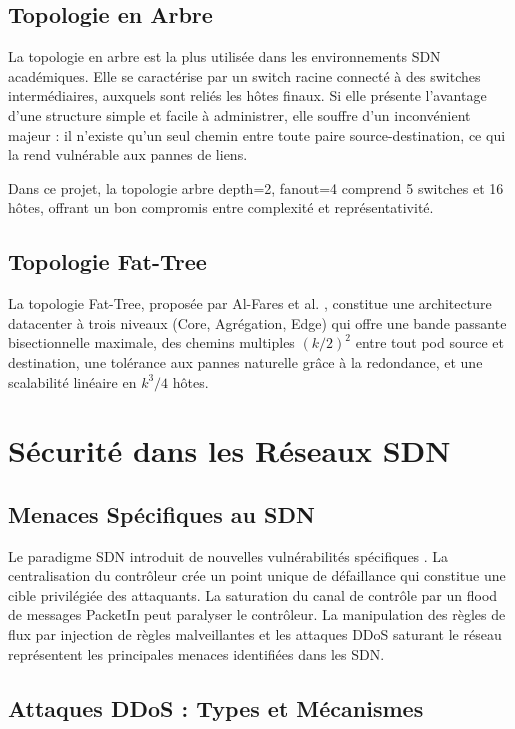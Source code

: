 \documentclass[12pt,a4paper]{report}
\begin{document}
\subsection{Topologie en Arbre}
La topologie en arbre est la plus utilisée dans les
environnements SDN académiques. Elle se caractérise par
un switch racine connecté à des switches intermédiaires,
auxquels sont reliés les hôtes finaux. Si elle présente
l'avantage d'une structure simple et facile à administrer,
elle souffre d'un inconvénient majeur : il n'existe qu'un
seul chemin entre toute paire source-destination, ce qui
la rend vulnérable aux pannes de liens.

Dans ce projet, la topologie arbre depth=2, fanout=4
comprend 5 switches et 16 hôtes, offrant un bon compromis
entre complexité et représentativité.

\subsection{Topologie Fat-Tree}
La topologie Fat-Tree, proposée par Al-Fares et al.
\cite{alfares2008scalable}, constitue une architecture
datacenter à trois niveaux (Core, Agrégation, Edge) qui
offre une bande passante bisectionnelle maximale, des
chemins multiples $(k/2)^2$ entre tout pod source et
destination, une tolérance aux pannes naturelle grâce
à la redondance, et une scalabilité linéaire en $k^3/4$
hôtes.

\section{Sécurité dans les Réseaux SDN}

\subsection{Menaces Spécifiques au SDN}
Le paradigme SDN introduit de nouvelles vulnérabilités
spécifiques \cite{sezer2013ready}. La centralisation du
contrôleur crée un point unique de défaillance qui
constitue une cible privilégiée des attaquants. La
saturation du canal de contrôle par un flood de messages
PacketIn peut paralyser le contrôleur. La manipulation
des règles de flux par injection de règles malveillantes
et les attaques DDoS saturant le réseau représentent
les principales menaces identifiées dans les SDN.

\subsection{Attaques DDoS : Types et Mécanismes}
\end{document}
